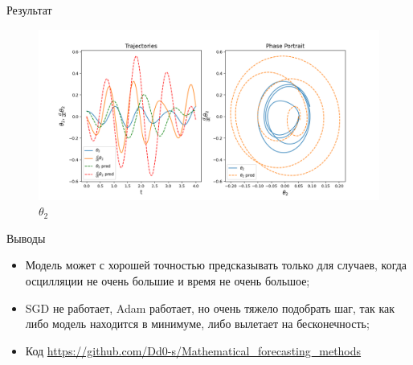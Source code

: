 \documentclass{beamer}
\begin{document}
\begin{frame}{Результат}

    \begin{figure}
        \centering
        \includegraphics[width = 1 \textwidth]{images/Graph_2.png}
        \caption{$\theta_2$}
    \end{figure}
  
\end{frame}


\begin{frame}{Выводы}
    \begin{itemize}
        \item Модель может с хорошей точностью предсказывать только для случаев, когда осцилляции не очень большие и время не очень большое;
        \item SGD не работает, Adam работает, но очень тяжело подобрать шаг, так как либо модель находится в минимуме, либо вылетает на бесконечность;
        \item Код \url{https://github.com/Dd0-s/Mathematical_forecasting_methods}
    \end{itemize}
\end{frame}

\end{document}
